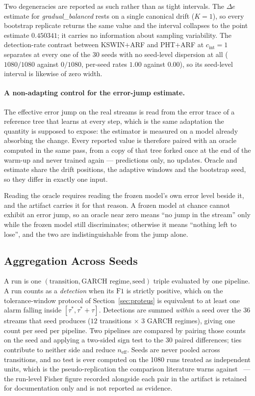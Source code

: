 Two degeneracies are reported as such rather than as tight intervals. The $\Delta e$ estimate for
\emph{gradual\_balanced} rests on a single canonical drift ($K = 1$), so every bootstrap replicate
returns the same value and the interval collapses to the point estimate $0.450341$; it carries no
information about sampling variability. The detection-rate contrast between KSWIN$+$ARF and
PHT$+$ARF at $c_{\mathrm{int}} = 1$ separates at every one of the 30 seeds with no seed-level
dispersion at all ($1080/1080$ against $0/1080$, per-seed rates $1.00$ against $0.00$), so its
seed-level interval is likewise of zero width.

\paragraph{A non-adapting control for the error-jump estimate.}
The effective error jump on the real streams is read from the error trace of a reference tree that
learns at every step, which is the same adaptation the quantity is supposed to expose: the estimator
is measured on a model already absorbing the change. Every reported value is therefore paired with
an oracle computed in the same pass, from a copy of that tree forked once at the end of the warm-up
and never trained again --- predictions only, no updates. Oracle and estimate share the drift
positions, the adaptive windows and the bootstrap seed, so they differ in exactly one input.

Reading the oracle requires reading the frozen model's own error level beside it, and the artifact
carries it for that reason. A frozen model at chance cannot exhibit an error jump, so an oracle near
zero means ``no jump in the stream'' only while the frozen model still discriminates; otherwise it
means ``nothing left to lose'', and the two are indistinguishable from the jump alone.

\subsection{Aggregation Across Seeds}\label{sec:protocol_aggregation}

A run is one $(\text{transition}, \text{GARCH regime}, \text{seed})$ triple evaluated by one
pipeline. A run counts as a \emph{detection} when its $\mathrm{F1}$ is strictly positive, which on
the tolerance-window protocol of Section~\ref{sec:proteus} is equivalent to at least one alarm
falling inside $[\tau^*, \tau^* + \tau]$. Detections are summed \emph{within} a seed over the 36
streams that seed produces ($12$ transitions $\times$ $3$ GARCH regimes), giving one count per seed
per pipeline. Two pipelines are compared by pairing those counts on the seed and applying a
two-sided sign test to the 30 paired differences; ties contribute to neither side and reduce
$n_{\mathrm{eff}}$. Seeds are never pooled across transitions, and no test is ever computed on the
1080 runs treated as independent units, which is the pseudo-replication the comparison literature
warns against~\cite{demsar_statistical_2006} --- the run-level Fisher figure recorded alongside each pair
in the artifact is retained for documentation only and is not reported as evidence.

